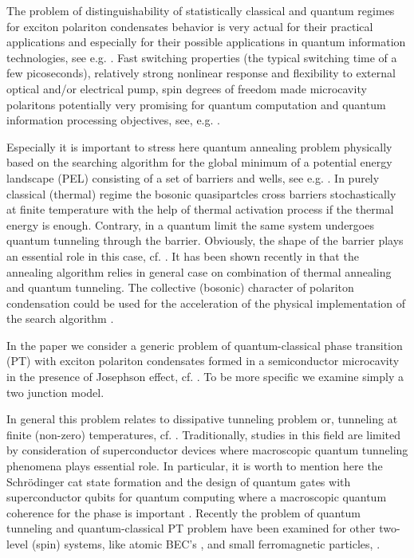 \documentclass[aps, pre, preprint, groupedaddress, superscriptaddress, showkeys, showpacs] {revtex4-1}
\begin{document}
The problem of distinguishability of statistically classical and quantum regimes for exciton polariton condensates behavior is very actual for their practical applications and especially for their possible applications in quantum information technologies, see e.g. \cite{Dominici}.
Fast switching properties (the typical switching time of a few picoseconds), relatively strong nonlinear response and flexibility to external optical and/or electrical pump, spin degrees of freedom made microcavity polaritons potentially very promising for quantum computation and quantum information processing objectives, see, e.g. \cite{Demirchyan,Pagel,Kyriienko,Solnyshkov_2015, Dominici}.

Especially it is important to stress here quantum annealing problem physically based on the searching algorithm for the global minimum of a potential energy landscape (PEL) consisting of a set of barriers and wells, see e.g.  \cite{Santoro, Das}. In purely classical  (thermal) regime the {bosonic quasipartcles cross barriers stochastically} at finite temperature with the help of thermal activation process if the thermal energy is enough. Contrary, in a quantum limit the same system undergoes quantum tunneling through the barrier. Obviously, the shape of the barrier plays an essential role in this case, cf. \cite{Das, Lewenstein}. It has been shown recently in \cite{Lewenstein} that the annealing algorithm relies in general case on combination of thermal annealing and quantum tunneling. The     
collective (bosonic) character of polariton condensation could be used for the acceleration of the physical implementation of the search algorithm \cite{Yan}.  
  
In the paper we consider a generic problem of quantum-classical phase transition (PT) with exciton polariton condensates formed in a semiconductor microcavity in the presence of Josephson effect, cf. \cite{Chudnovsky_1997,Aleiner, Shelykh_2008, Borgh_2010}. To be more specific we examine simply a two junction model.
 
In general this problem relates to dissipative tunneling problem or, tunneling at finite (non-zero) temperatures, cf. \cite{Caldeira, Larkin, Riseborough}.
Traditionally,  studies in this field are limited by consideration of superconductor devices \cite{Ankerhold} where macroscopic quantum tunneling phenomena plays essential role.
In particular, it is worth to mention here the Schr\"odinger cat state formation \cite{Leggett} and the 	design of quantum gates with superconductor qubits for quantum computing where a macroscopic quantum coherence for the phase is important \cite{Makhlin}.
Recently the problem of quantum tunneling and quantum-classical PT problem have been examined for other two-level (spin) systems, like atomic BEC's \cite{Zhang}, and small ferromagnetic particles, \cite{Owerre}.
  
\end{document}
